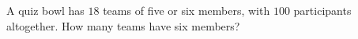 A quiz bowl has $18$ teams of five or six members, with $100$ participants altogether. How many teams have six members?
